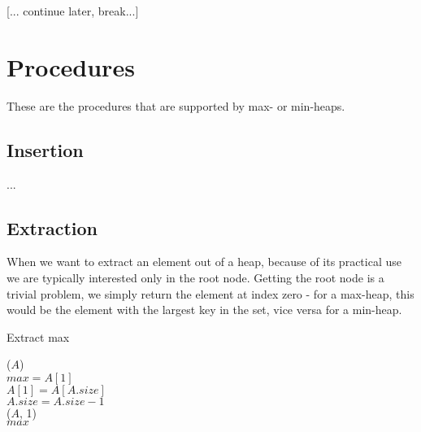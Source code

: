 [... continue later, break...]

\newpage

\section{Procedures}
\label{ch:heaps|sec:procedures}
These are the procedures that are supported by max- or min-heaps.

\subsection{Insertion}
\label{ch:heaps|sec:procedures|sub:insertion}
...


\subsection{Extraction}
\label{ch:heaps|sec:procedures|sub:extraction}
When we want to extract an element out of a heap, because of its practical use
we are typically interested only in the root node. Getting the root node is a
trivial problem, we simply return the element at index zero - for a max-heap,
this would be the element with the largest key in the set, vice versa for a
min-heap.

\begin{algorithm}[H]
	\caption{Extract max}
	\label{alg:heap-extract-max}
	
	
	
	
	
	\BlankLine
	\ExtractMax($A$) \\
	\Begin
	{
		$max = A[1]$ \\
		$A[1] = A[A.size]$ \\
		$A.size = A.size - 1$ \\
		\MaxHeapify($A$, 1) \\
		\Return $max$
	}
\end{algorithm}

